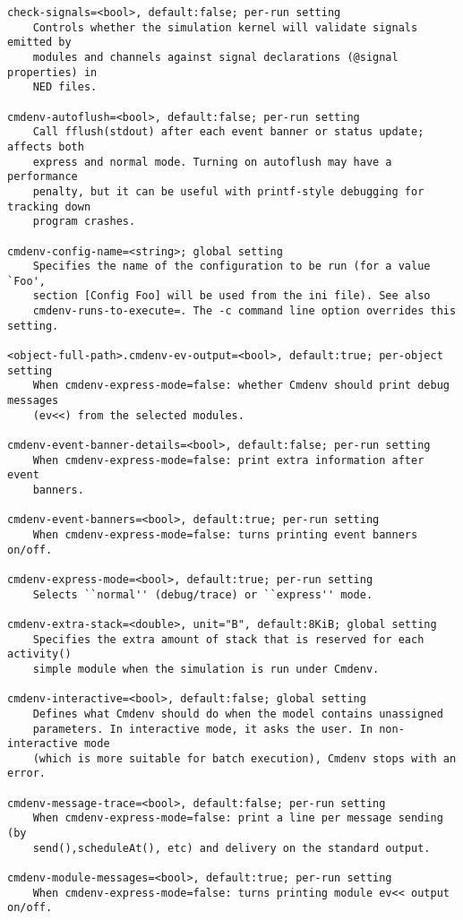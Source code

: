 \begin{verbatim}
check-signals=<bool>, default:false; per-run setting
    Controls whether the simulation kernel will validate signals emitted by
    modules and channels against signal declarations (@signal properties) in
    NED files.

cmdenv-autoflush=<bool>, default:false; per-run setting
    Call fflush(stdout) after each event banner or status update; affects both
    express and normal mode. Turning on autoflush may have a performance
    penalty, but it can be useful with printf-style debugging for tracking down
    program crashes.

cmdenv-config-name=<string>; global setting
    Specifies the name of the configuration to be run (for a value `Foo',
    section [Config Foo] will be used from the ini file). See also
    cmdenv-runs-to-execute=. The -c command line option overrides this setting.

<object-full-path>.cmdenv-ev-output=<bool>, default:true; per-object setting
    When cmdenv-express-mode=false: whether Cmdenv should print debug messages
    (ev<<) from the selected modules.

cmdenv-event-banner-details=<bool>, default:false; per-run setting
    When cmdenv-express-mode=false: print extra information after event
    banners.

cmdenv-event-banners=<bool>, default:true; per-run setting
    When cmdenv-express-mode=false: turns printing event banners on/off.

cmdenv-express-mode=<bool>, default:true; per-run setting
    Selects ``normal'' (debug/trace) or ``express'' mode.

cmdenv-extra-stack=<double>, unit="B", default:8KiB; global setting
    Specifies the extra amount of stack that is reserved for each activity()
    simple module when the simulation is run under Cmdenv.

cmdenv-interactive=<bool>, default:false; global setting
    Defines what Cmdenv should do when the model contains unassigned
    parameters. In interactive mode, it asks the user. In non-interactive mode
    (which is more suitable for batch execution), Cmdenv stops with an error.

cmdenv-message-trace=<bool>, default:false; per-run setting
    When cmdenv-express-mode=false: print a line per message sending (by
    send(),scheduleAt(), etc) and delivery on the standard output.

cmdenv-module-messages=<bool>, default:true; per-run setting
    When cmdenv-express-mode=false: turns printing module ev<< output on/off.


\end{verbatim}
